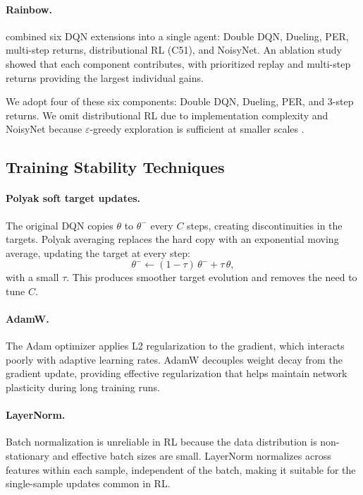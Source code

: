 \documentclass[12pt,a4paper,titlepage]{article}
\begin{document}
\paragraph{Rainbow.} \citet{Hessel2018} combined six DQN extensions into a single agent: Double DQN, Dueling, PER, multi-step returns, distributional RL (C51), and NoisyNet. An ablation study showed that each component contributes, with prioritized replay and multi-step returns providing the largest individual gains.

We adopt four of these six components: Double DQN, Dueling, PER, and 3-step returns. We omit distributional RL due to implementation complexity and NoisyNet because $\varepsilon$-greedy exploration is sufficient at smaller scales \citep{ObandoCeron2021, Fortunato2018}.

\subsection{Training Stability Techniques}
\label{sec:stability}

\paragraph{Polyak soft target updates.} The original DQN copies $\theta$ to $\theta^-$ every $C$ steps, creating discontinuities in the targets. Polyak averaging \citep{Polyak1992, Lillicrap2016} replaces the hard copy with an exponential moving average, updating the target at every step:
\begin{equation}
\theta^- \leftarrow (1 - \tau)\,\theta^- + \tau\,\theta,
\end{equation}
with a small $\tau$. This produces smoother target evolution and removes the need to tune $C$.

\paragraph{AdamW.} The Adam optimizer applies L2 regularization to the gradient, which interacts poorly with adaptive learning rates. AdamW \citep{Loshchilov2019} decouples weight decay from the gradient update, providing effective regularization that helps maintain network plasticity during long training runs.

\paragraph{LayerNorm.} Batch normalization is unreliable in RL because the data distribution is non-stationary and effective batch sizes are small. LayerNorm \citep{Ba2016} normalizes across features within each sample, independent of the batch, making it suitable for the single-sample updates common in RL.
\end{document}
